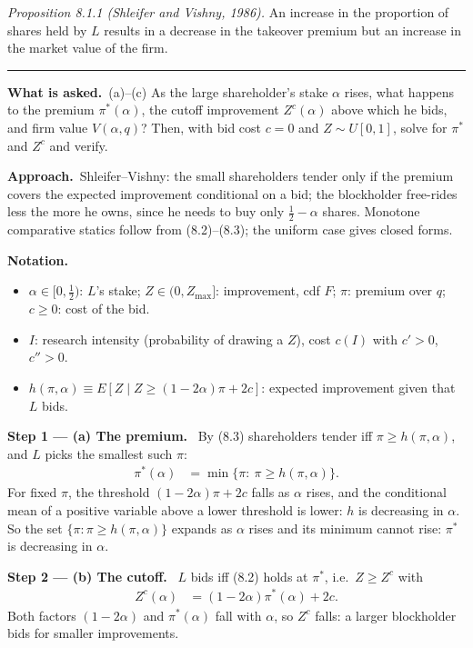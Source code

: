 \documentclass[11pt,a4paper]{article}
\newcommand{\notation}{\par\noindent\textbf{Notation.}}
\newcommand{\step}[2]{\par\medskip\noindent\textbf{Step #1 --- #2.}~}
\newcommand{\asked}{\par\medskip\noindent\textbf{What is asked.}~}
\newcommand{\approach}{\par\smallskip\noindent\textbf{Approach.}~}
\newcommand{\stmtend}{\par\endgroup\nopagebreak\noindent\rule{\linewidth}{0.4pt}\par\medskip}
\begin{document}
\emph{Proposition 8.1.1 (Shleifer and Vishny, 1986).} An increase in the proportion of shares held
by \(L\) results in a decrease in the takeover premium but an increase in the market value of the
firm.
\stmtend

\asked (a)--(c) As the large shareholder's stake $\alpha$ rises, what happens to the premium $\pi^*(\alpha)$, the cutoff improvement $Z^c(\alpha)$ above which he bids, and firm value $V(\alpha,q)$? Then, with bid cost $c=0$ and $Z\sim U[0,1]$, solve for $\pi^*$ and $Z^c$ and verify.

\approach Shleifer--Vishny: the small shareholders tender only if the premium covers the expected improvement conditional on a bid; the blockholder free-rides less the more he owns, since he needs to buy only $\tfrac12-\alpha$ shares. Monotone comparative statics follow from (8.2)--(8.3); the uniform case gives closed forms.

\notation
\begin{itemize}
  \item $\alpha\in[0,\tfrac12)$: $L$'s stake; $Z\in(0,Z_{\max}]$: improvement, cdf $F$; $\pi$: premium over $q$; $c\ge0$: cost of the bid.
  \item $I$: research intensity (probability of drawing a $Z$), cost $c(I)$ with $c'>0$, $c''>0$.
  \item $h(\pi,\alpha)\equiv E[Z\mid Z\ge(1-2\alpha)\pi+2c]$: expected improvement given that $L$ bids.
\end{itemize}

\step{1}{(a) The premium} By (8.3) shareholders tender iff $\pi\ge h(\pi,\alpha)$, and $L$ picks the smallest such $\pi$:
\begin{align}
  \pi^*(\alpha) &= \min\{\pi:\ \pi\ge h(\pi,\alpha)\}. \label{r8e7-pistar}
\end{align}
For fixed $\pi$, the threshold $(1-2\alpha)\pi+2c$ falls as $\alpha$ rises, and the conditional mean of a positive variable above a lower threshold is lower: $h$ is decreasing in $\alpha$. So the set $\{\pi:\pi\ge h(\pi,\alpha)\}$ expands as $\alpha$ rises and its minimum cannot rise: $\pi^*$ is decreasing in $\alpha$.

\step{2}{(b) The cutoff} $L$ bids iff (8.2) holds at $\pi^*$, i.e.\ $Z\ge Z^c$ with
\begin{align}
  Z^c(\alpha) &= (1-2\alpha)\pi^*(\alpha)+2c. \label{r8e7-zc}
\end{align}
Both factors $(1-2\alpha)$ and $\pi^*(\alpha)$ fall with $\alpha$, so $Z^c$ falls: a larger blockholder bids for smaller improvements.
\end{document}
